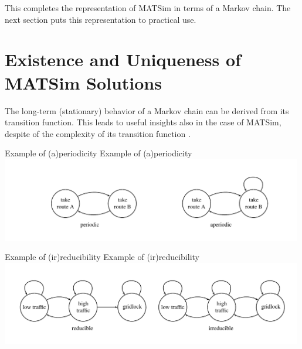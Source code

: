 This completes the representation of MATSim in terms of a Markov chain.
The next section puts this representation to practical use.


\section{\label{sec:Existence-and-uniqueness}Existence and Uniqueness of
MATSim Solutions}

The long-term (stationary) behavior of a Markov chain can be derived
from its transition function. This leads to useful insights also in
the case of MATSim, despite of the complexity of its transition function
.

\createfigure%
{Example of (a)periodicity}%
{Example of (a)periodicity}%
{\label{fig:Example-of-(a)periodicity}}%
{\includegraphics[width=0.99\textwidth, angle=0]{understanding/figures/mc/fig1.pdf}}%
{}

\createfigure%
{Example of (ir)reducibility}%
{Example of (ir)reducibility}%
{\label{fig:Example-of-(ir)reducibility}}%
{\includegraphics[width=0.99\textwidth, angle=0]{understanding/figures/mc/fig2.pdf}}%
{}

